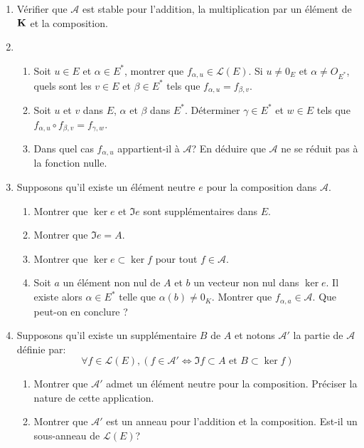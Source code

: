 \begin{enumerate}
 \item Vérifier que $\mathcal{A}$ est stable pour l'addition, la multiplication par un élément de $\mathbf{K}$ et la composition.
 \item 
\begin{enumerate}
 \item Soit $u\in E$ et $\alpha\in E^*$, montrer que $f_{\alpha, u}\in \mathcal{L}(E)$. Si $u\neq 0_E$ et $\alpha \neq O_{E^*}$, quels sont les $v\in E$ et $\beta\in E^*$ tels que  $f_{\alpha, u} = f_{\beta, v}$.
 \item Soit $u$ et $v$ dans $E$, $\alpha$ et $\beta$ dans $E^*$. Déterminer $\gamma \in E^*$ et $w\in E$ tels que $f_{\alpha, u} \circ f_{\beta, v} = f_{\gamma, w}$.
\item Dans quel cas $f_{\alpha, u}$ appartient-il à $\mathcal{A}$? En déduire que $\mathcal{A}$ ne se réduit pas à la fonction nulle. 
\end{enumerate}
\item Supposons qu'il existe un élément neutre $e$ pour la composition dans $\mathcal{A}$.
\begin{enumerate}
  \item Montrer que $\ker e$ et $\Im e$ sont supplémentaires dans $E$.
  \item Montrer que $\Im e = A$.
  \item Montrer que $\ker e \subset \ker f$ pour tout $f\in\mathcal{A}$.
  \item Soit $a$ un élément non nul de $A$ et $b$ un vecteur non nul dans $\ker e$. Il existe alors $\alpha\in E^*$ telle que $\alpha(b)\neq 0_K$. Montrer que $f_{\alpha, a}\in \mathcal A$. Que peut-on en conclure ?
\end{enumerate}
\item Supposons qu'il existe un supplémentaire  $B$ de $A$ et notons $\mathcal{A}'$ la partie de $\mathcal{A}$ définie par:
\begin{displaymath}
 \forall f\in\mathcal{L}(E),\left(  f\in \mathcal{A}' \Leftrightarrow \Im f \subset A \text{ et } B\subset \ker f\right) 
\end{displaymath}
\begin{enumerate}
 \item Montrer que $\mathcal{A}'$ admet un élément neutre pour la composition. Préciser la nature de cette application.
 \item Montrer que $\mathcal{A}'$ est un anneau pour l'addition et la composition. Est-il un sous-anneau de $\mathcal{L}(E)$? 
\end{enumerate}
\end{enumerate}
